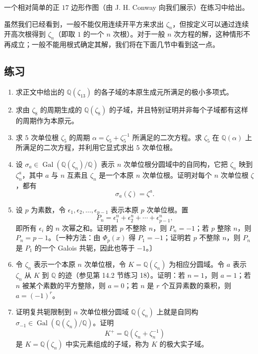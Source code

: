 一个相对简单的正 $17$ 边形作图（由 J. H. Conway 向我们展示）在练习中给出。

虽然我们已经看到，一般不能仅用连续开平方来求出 $\zeta_n$，但按定义可以通过连续开高次根得到 $\zeta_n$（即取 $1$ 的一个 $n$ 次根）。对于一般 $n$ 次方程的解，这种情形不再成立；一般不能用根式确定其解，我们将在下面几节中看到这一点。

\subsection*{练习}
\begin{enumerate}[label=\arabic*.]
\item 求正文中给出的 $\mathbb Q(\zeta_{13})$ 的各子域的本原生成元所满足的极小多项式。

\item 求由 $\zeta_8$ 的周期生成的 $\mathbb Q(\zeta_8)$ 的子域，并且特别证明并非每个子域都有这样的周期作为本原元。

\item 求 $5$ 次单位根 $\zeta_5$ 的周期 $\alpha=\zeta_5+\zeta_5^{-1}$ 所满足的二次方程。求 $\zeta_5$ 在 $\mathbb Q(\alpha)$ 上所满足的二次方程，并利用它显式求出 $5$ 次单位根。

\item 设 $\sigma_a\in\operatorname{Gal}(\mathbb Q(\zeta_n)/\mathbb Q)$ 表示 $n$ 次单位根分圆域中的自同构，它把 $\zeta_n$ 映到 $\zeta_n^a$，其中 $a$ 与 $n$ 互素且 $\zeta_n$ 是一个本原 $n$ 次单位根。证明对每个 $n$ 次单位根 $\zeta$，都有
\[
\sigma_a(\zeta)=\zeta^a.
\]

\item 设 $p$ 为素数，令 $\epsilon_1,\epsilon_2,\ldots,\epsilon_{p-1}$ 表示本原 $p$ 次单位根。置
\[
P_n=\epsilon_1^n+\epsilon_2^n+\cdots+\epsilon_{p-1}^n,
\]
即所有 $\epsilon_i$ 的 $n$ 次幂之和。证明若 $p$ 不整除 $n$，则 $P_n=-1$；若 $p$ 整除 $n$，则 $P_n=p-1$。〔一种方法：由 $\Phi_p(x)$ 得 $P_1=-1$；证明若 $p$ 不整除 $n$，则 $P_n$ 是 $P_1$ 的一个 Galois 共轭，因此也等于 $-1$。〕

\item 令 $\zeta_n$ 表示一个本原 $n$ 次单位根，令 $K=\mathbb Q(\zeta_n)$ 为相应分圆域。令 $a$ 表示 $\zeta_n$ 从 $K$ 到 $\mathbb Q$ 的迹（参见第 14.2 节练习 18）。证明：若 $n=1$，则 $a=1$；若 $n$ 被某个素数的平方整除，则 $a=0$；若 $n$ 是 $r$ 个互异素数的乘积，则 $a=(-1)^r$。

\item 证明复共轭限制到 $n$ 次单位根分圆域 $\mathbb Q(\zeta_n)$ 上就是自同构 $\sigma_{-1}\in\operatorname{Gal}(\mathbb Q(\zeta_n)/\mathbb Q)$。证明
\[
K^+=\mathbb Q(\zeta_n+\zeta_n^{-1})
\]
是 $K=\mathbb Q(\zeta_n)$ 中实元素组成的子域，称为 $K$ 的极大实子域。


\end{enumerate}
